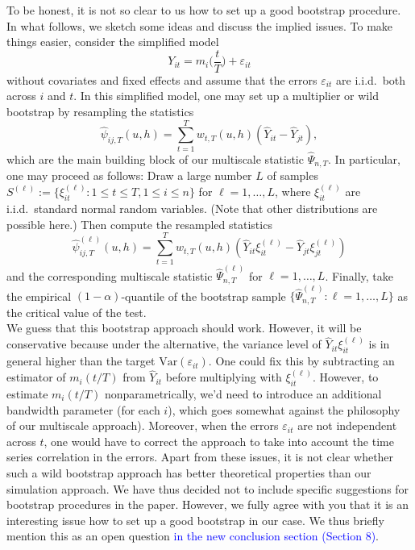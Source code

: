 \documentclass[a4paper,12pt]{article}
\begin{document}
\begin{enumerate}[label=\arabic*.,leftmargin=0.6cm]
To be honest, it is not so clear to us how to set up a good bootstrap procedure. In what follows, we sketch some ideas and discuss the implied issues. To make things easier, consider the simplified model 
\[ Y_{it} = m_i\Big(\frac{t}{T}\Big) + \varepsilon_{it} \]
without covariates and fixed effects and assume that the errors $\varepsilon_{it}$ are i.i.d.\ both across $i$ and $t$. In this simplified model, one may set up a multiplier or wild bootstrap by resampling the statistics
\[ \widehat{\psi}_{ij,T}(u,h) = \sum_{t=1}^T w_{t,T}(u,h) (\widehat{Y}_{it} - \widehat{Y}_{jt}), \]
which are the main building block of our multiscale statistic $\widehat{\Psi}_{n,T}$. In particular, one may proceed as follows: Draw a large number $L$ of samples $S^{(\ell)} := \{\xi_{it}^{(\ell)}: 1 \le t \le T, 1 \le i \le n \}$ for $\ell=1,\ldots,L$, where $\xi_{it}^{(\ell)}$ are i.i.d.\ standard normal random variables. (Note that other distributions are possible here.) Then compute the resampled statistics  
\[ \widehat{\psi}_{ij,T}^{(\ell)}(u,h) = \sum_{t=1}^T w_{t,T}(u,h) (\widehat{Y}_{it} \xi_{it}^{(\ell)} - \widehat{Y}_{jt} \xi_{jt}^{(\ell)}) \]
and the corresponding multiscale statistic $\widehat{\Psi}_{n,T}^{(\ell)}$ for $\ell=1,\ldots,L$. Finally, take the empirical $(1-\alpha)$-quantile of the bootstrap sample $\{ \widehat{\Psi}_{n,T}^{(\ell)}:  \ell=1,\ldots,L \}$ as the critical value of the test. \\
We guess that this bootstrap approach should work. However, it will be conservative because under the alternative, the variance level of $\widehat{Y}_{it} \xi_{it}^{(\ell)}$ is in general higher than the target $\text{Var}(\varepsilon_{it})$. One could fix this by subtracting an estimator of $m_i(t/T)$ from $\widehat{Y}_{it}$ before multiplying with $\xi_{it}^{(\ell)}$. However, to estimate $m_i(t/T)$ nonparametrically, we'd need to introduce an additional bandwidth parameter (for each $i$), which goes somewhat against the philosophy of our multiscale approach). Moreover, when the errors $\varepsilon_{it}$ are not independent across $t$, one would have to correct the approach to take into account the time series correlation in the errors. Apart from these issues, it is not clear whether such a wild bootstrap approach has better theoretical properties than our simulation approach. We have thus decided not to include specific suggestions for bootstrap procedures in the paper. However, we fully agree with you that it is an interesting issue how to set up a good bootstrap in our case. We thus briefly mention this as an open question \textcolor{blue}{in the new conclusion section (Section 8)}. 



\end{enumerate}
\end{document}

